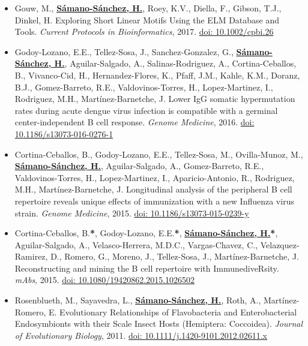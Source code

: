 \documentclass[11pt,a4paper,sans]{moderncv} %
\begin{document}
\begin{itemize}
  \item Gouw, M., \textbf{\underline{S\'amano-S\'anchez, H.}}, Roey, K.V., Diella, F., Gibson, T.J., Dinkel, H. Exploring Short Linear Motifs Using the ELM Database and Tools. \textit{Current Protocols in Bioinformatics}, 2017. \href{https://doi.org/10.1002/cpbi.26}{doi: 10.1002/cpbi.26}
  \item Godoy-Lozano, E.E., Tellez-Sosa, J., Sanchez-Gonzalez, G., \textbf{\underline{S\'amano-S\'anchez, H.}}, Aguilar-Salgado, A., Salinas-Rodriguez, A., Cortina-Ceballos, B., Vivanco-Cid, H., Hernandez-Flores, K., Pfaff, J.M., Kahle, K.M., Doranz, B.J., Gomez-Barreto, R.E., Valdovinos-Torres, H., Lopez-Martinez, I., Rodriguez, M.H., Mart\'inez-Barnetche, J. Lower IgG somatic hypermutation rates during acute dengue virus infection is compatible with a germinal center-independent B cell response. \textit{Genome Medicine}, 2016. \href{https://doi.org/10.1186/s13073-016-0276-1}{doi: 10.1186/s13073-016-0276-1}
  \item Cortina-Ceballos, B., Godoy-Lozano, E.E., Tellez-Sosa, M., Ovilla-Munoz, M., \textbf{\underline{S\'amano-S\'anchez, H.}}, Aguilar-Salgado, A., Gomez-Barreto, R.E., Valdovinos-Torres, H., Lopez-Martinez, I., Aparicio-Antonio, R., Rodriguez, M.H., Mart\'inez-Barnetche, J. Longitudinal analysis of the peripheral B cell repertoire reveals unique effects of immunization with a new Influenza virus strain. \textit{Genome Medicine}, 2015. \href{https://doi.org/10.1186/s13073-015-0239-y}{doi: 10.1186/s13073-015-0239-y}
  \item Cortina-Ceballos, B.\textbf{*}, Godoy-Lozano, E.E.\textbf{*}, \textbf{\underline{S\'amano-S\'anchez, H.}}\textbf{*}, Aguilar-Salgado, A., Velasco-Herrera, M.D.C., Vargas-Chavez, C., Velazquez-Ramirez, D., Romero, G., Moreno, J., Tellez-Sosa, J., Mart\'inez-Barnetche, J. Reconstructing and mining the B cell repertoire with ImmunediveRsity. \textit{mAbs}, 2015. \href{https://doi.org/10.1080/19420862.2015.1026502}{doi: 10.1080/19420862.2015.1026502}
  \item Rosenblueth, M., Sayavedra, L., \textbf{\underline{S\'amano-S\'anchez, H.}}, Roth, A., Mart\'inez-Romero, E. Evolutionary Relationships of Flavobacteria and Enterobacterial Endosymbionts with their Scale Insect Hosts (Hemiptera: Coccoidea). \textit{Journal of Evolutionary Biology}, 2011. \href{https://doi.org/10.1111/j.1420-9101.2012.02611.x}{doi: 10.1111/j.1420-9101.2012.02611.x}\\
\end{itemize}
\pagebreak
\end{document}

